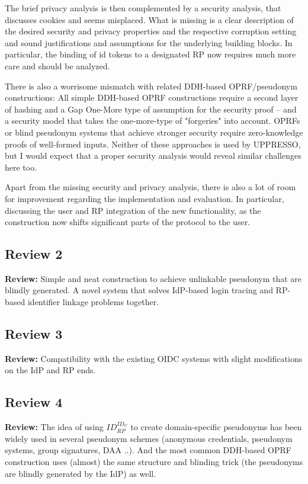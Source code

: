 \documentclass[letterpaper,onecolumn,10pt]{article}
\begin{document}
The brief privacy analysis is then complemented by a security analysis, that discusses cookies and seems misplaced.
What is missing is a clear description of the desired security and privacy properties and the respective corruption setting and sound justifications and assumptions for the underlying building blocks. In particular, the binding of id tokens to a designated RP now requires much more care and should be analyzed.

There is also a worrisome mismatch with related DDH-based OPRF/pseudonym constructions: All simple DDH-based OPRF constructions require a second layer of hashing and a Gap One-More type of assumption for the security proof -- and a security model that takes the one-more-type of "forgeries" into account. OPRFs or blind pseudonym systems that achieve stronger security require zero-knowledge proofs of well-formed inputs. Neither of these approaches is used by UPPRESSO, but I would expect that a proper security analysis would reveal similar challenges here too.

Apart from the missing security and privacy analysis, there is also a lot of room for improvement regarding the implementation and evaluation. In particular, discussing the user and RP integration of the new functionality, as the construction now shifts significant parts of the protocol to the user.

\subsection*{Review 2}
\vspace{1mm}\noindent\textbf{Review:}
Simple and neat construction to achieve unlinkable pseudonym that are blindly generated.
A novel system that solves IdP-based login tracing and RP-based identifier linkage problems together.

\subsection*{Review 3}
\vspace{1mm}\noindent\textbf{Review:}
Compatibility with the existing OIDC systems with slight modifications on the IdP and RP ends.

\subsection*{Review 4}
\vspace{1mm}\noindent\textbf{Review:}
The idea of using $ID_{RP}^{ID_U}$ to create domain-specific pseudonyms has been widely used in several pseudonym schemes (anonymous credentials, pseudonym systems, group signatures, DAA ..). And the most common DDH-based OPRF construction uses (almost) the same structure and blinding trick (the pseudonyms are blindly generated by the IdP) as well.
\end{document}
